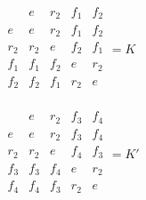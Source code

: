 \documentclass[letterpaper,12pt,fleqn]{article}
\begin{document}
\begin{minipage}{3in}
  $\begin{array}{c|cccc}
    & e & r_2 & f_1 & f_2 \\
    \hline
    e & e & r_2 & f_1 & f_2 \\
    r_2 & r_2 & e & f_2 & f_1 \\
    f_1 & f_1 & f_2 & e & r_2 \\
    f_2 & f_2 & f_1 & r_2 & e \\
  \end{array}=K$
\end{minipage}
\begin{minipage}{3in}
  $\begin{array}{c|cccc}
    & e & r_2 & f_3 & f_4 \\
    \hline
    e & e & r_2 & f_3 & f_4 \\
    r_2 & r_2 & e & f_4 & f_3 \\
    f_3 & f_3 & f_4 & e & r_2 \\
    f_4 & f_4 & f_3 & r_2 & e \\
  \end{array}=K'$
\end{minipage}
\end{document}
